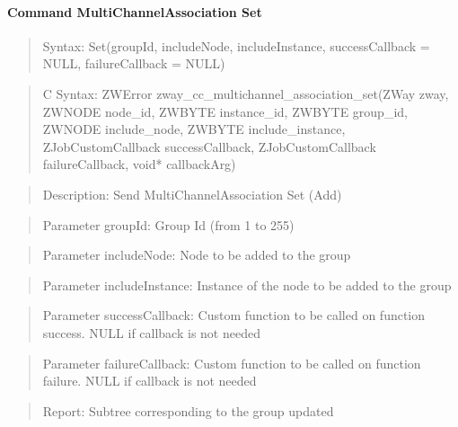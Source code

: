 \paragraph{Command MultiChannelAssociation Set}
\begin{quote}Syntax: Set(groupId, includeNode, includeInstance, successCallback = NULL, failureCallback = NULL)\end{quote}
\begin{quote}C Syntax: ZWError zway\_cc\_multichannel\_association\_set(ZWay zway, ZWNODE node\_id, ZWBYTE instance\_id, ZWBYTE group\_id, ZWNODE include\_node, ZWBYTE include\_instance, ZJobCustomCallback successCallback, ZJobCustomCallback failureCallback, void* callbackArg)\end{quote}
\begin{quote}Description: Send MultiChannelAssociation Set (Add)\end{quote}
\begin{quote}Parameter groupId: Group Id (from 1 to 255)\end{quote}
\begin{quote}Parameter includeNode: Node to be added to the group\end{quote}
\begin{quote}Parameter includeInstance: Instance of the node to be added to the group\end{quote}
\begin{quote}Parameter successCallback: Custom function to be called on function success. NULL if callback is not needed\end{quote}
\begin{quote}Parameter failureCallback: Custom function to be called on function failure. NULL if callback is not needed\end{quote}
\begin{quote}Report: Subtree corresponding to the group updated\end{quote}

